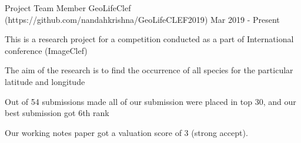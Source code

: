 

\begin{cventries}

  \cventry
    {Project Team Member} %
    {GeoLifeClef ({\tiny https://github.com/nandahkrishna/GeoLifeCLEF2019})} %
    {} %
    {Mar 2019 - Present} %
    {
      \begin{cvitems} %
        \item {This is a research project for a competition conducted as a part of International conference (ImageClef)}
        \item{The aim of the research is to find the occurrence  of all species for the particular latitude and longitude  }
        \item{Out of 54 submissions made all of our submission were placed in top 30, and our best submission got 6th rank}
        \item{Our working notes paper got a valuation score of 3 (strong accept). }
      \end{cvitems}
    }


\end{cventries}
